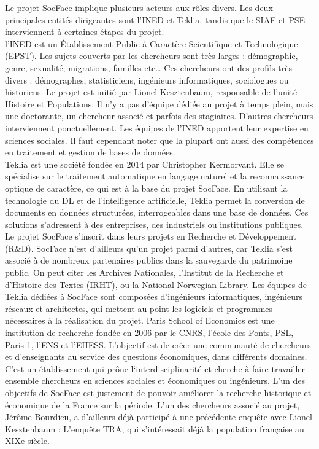 Le projet SocFace implique plusieurs acteurs aux rôles divers. Les deux principales entités dirigeantes sont l'{\gls{INED}} et Teklia, tandis que le \gls{SIAF} et \gls{PSE} interviennent à certaines étapes du projet.\\
l'\gls{INED} est un Établissement Public à Caractère Scientifique et Technologique (EPST). Les sujets couverts par les chercheurs sont très larges : démographie, genre, sexualité, migrations, familles etc… Ces chercheurs ont des profils très divers : démographes, statisticiens, ingénieurs informatiques, sociologues ou historiens. Le projet est initié par Lionel Kesztenbaum, responsable de l’unité Histoire et Populations. Il n’y a pas d’équipe dédiée au projet à temps plein, mais une doctorante, un chercheur associé et parfois des stagiaires. D’autres chercheurs interviennent ponctuellement. Les équipes de l'\gls{INED} apportent leur expertise en sciences sociales. Il faut cependant noter que la plupart ont aussi des compétences en traitement et gestion de bases de données.\\
Teklia est une société fondée en 2014 par Christopher Kermorvant. Elle se spécialise sur le traitement automatique en langage naturel et la reconnaissance optique de caractère, ce qui est à la base du projet SocFace. En utilisant la technologie du \gls{DL} et de l’intelligence artificielle, Teklia permet la conversion de documents en données structurées, interrogeables dans une base de données. Ces solutions s’adressent à des entreprises, des industriels ou institutions publiques. Le projet SocFace s’inscrit dans leurs projets en Recherche et Développement (R\&D). SocFace n’est d’ailleurs qu’un projet parmi d’autres, car Teklia s’est associé à de nombreux partenaires publics dans la sauvegarde du patrimoine public. On peut citer les Archives Nationales, l’Institut de la Recherche et d’Histoire des Textes (IRHT), ou la National Norwegian Library. Les équipes de Teklia dédiées à SocFace sont composées d’ingénieurs informatiques, ingénieurs réseaux et architectes, qui mettent au point les logiciels et programmes nécessaires à la réalisation du projet. 
Paris School of Economics est une institution de recherche fondée en 2006 par le CNRS, l’école des Ponts, \gls{PSL}, Paris 1, l'\gls{ENS} et l’\gls{EHESS}. L’objectif est de créer une communauté de chercheurs et d’enseignants au service des questions économiques, dans différents domaines. C’est un établissement qui prône l‘interdisciplinarité et cherche à faire travailler ensemble chercheurs en sciences sociales et économiques ou ingénieurs. L’un des objectifs de SocFace est justement de pouvoir améliorer la recherche historique et économique de la France sur la période. L’un des chercheurs associé au projet, Jérôme Bourdieu, a d’ailleurs déjà participé à une précédente enquête avec Lionel Kesztenbaum : L’enquête TRA, qui s’intéressait déjà la population française au XIXe siècle.\\
